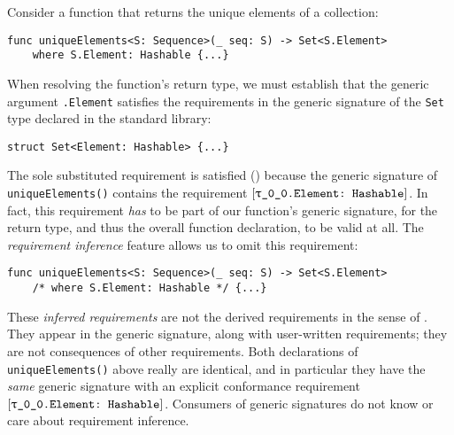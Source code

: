 \documentclass[../generics]{subfiles}
\begin{document}
Consider a function that returns the unique elements of a collection:
\begin{Verbatim}
func uniqueElements<S: Sequence>(_ seq: S) -> Set<S.Element>
    where S.Element: Hashable {...}
\end{Verbatim}
When resolving the function's return type, we must establish that the generic argument \texttt{\rT.Element} satisfies the requirements in the generic signature of the \texttt{Set} type declared in the standard library:
\begin{Verbatim}
struct Set<Element: Hashable> {...}
\end{Verbatim}
The sole substituted requirement is satisfied () because the generic signature of \texttt{uniqueElements()} contains the requirement $\ConfReq{\rT.Element}{Hashable}$. In fact, this requirement \emph{has} to be part of our function's generic signature, for the return type, and thus the overall function declaration, to be valid at all. The \emph{requirement inference} feature allows us to omit this requirement:
\begin{Verbatim}
func uniqueElements<S: Sequence>(_ seq: S) -> Set<S.Element>
    /* where S.Element: Hashable */ {...}
\end{Verbatim}
These \emph{inferred requirements} are not the derived requirements in the sense of . They appear in the generic signature, along with user-written requirements; they are not consequences of other requirements. Both declarations of \texttt{uniqueElements()} above really are identical, and in particular they have the \emph{same} generic signature with an explicit conformance requirement $\ConfReq{\rT.Element}{Hashable}$. Consumers of generic signatures do not know or care about requirement inference.
\end{document}
